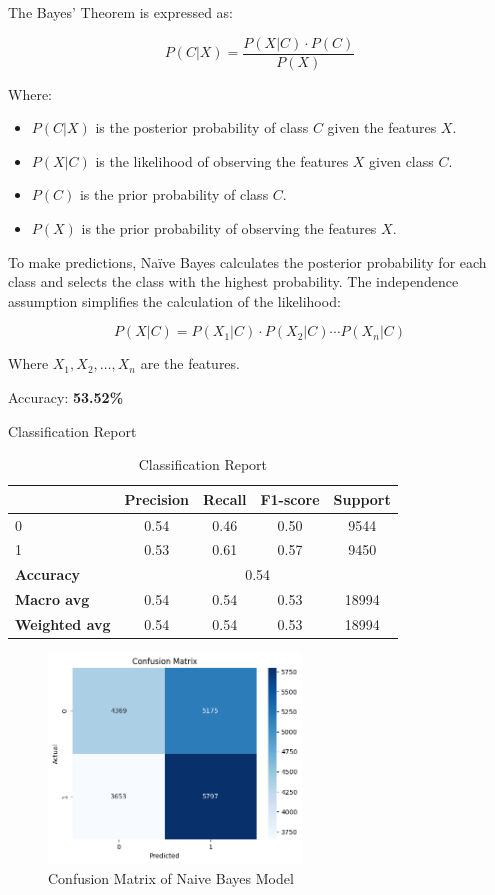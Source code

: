 The Bayes' Theorem is expressed as:

\[
P(C | X) = \frac{P(X | C) \cdot P(C)}{P(X)}
\]

Where:
\begin{itemize}
    \item \( P(C | X) \) is the posterior probability of class \( C \) given the features \( X \).
    \item \( P(X | C) \) is the likelihood of observing the features \( X \) given class \( C \).
    \item \( P(C) \) is the prior probability of class \( C \).
    \item \( P(X) \) is the prior probability of observing the features \( X \).
\end{itemize}

To make predictions, Naïve Bayes calculates the posterior probability for each class and selects the class with the highest probability. The independence assumption simplifies the calculation of the likelihood:

\[
P(X | C) = P(X_1 | C) \cdot P(X_2 | C) \cdots P(X_n | C)
\]

Where \( X_1, X_2, \ldots, X_n \) are the features.

Accuracy: \textbf{53.52\%}


Classification Report
\begin{table}[h]
    \centering
    \begin{tabular}{lcccc}
        \toprule
        & \textbf{Precision} & \textbf{Recall} & \textbf{F1-score} & \textbf{Support} \\
        \midrule
        0 & 0.54 & 0.46 & 0.50 & 9544 \\
        1 & 0.53 & 0.61 & 0.57 & 9450 \\
        \midrule
        \textbf{Accuracy} & \multicolumn{4}{c}{0.54} \\
        \textbf{Macro avg} & 0.54 & 0.54 & 0.53 & 18994 \\
        \textbf{Weighted avg} & 0.54 & 0.54 & 0.53 & 18994 \\
        \bottomrule
    \end{tabular}
    \caption{Classification Report}
    \label{tab:classification_report}
\end{table}

\begin{figure}[H] 
    \centering 
    \includegraphics[width=0.6\textwidth]{media/naive_bayes_confusion_matrix.png}
    \caption{Confusion Matrix of Naive Bayes Model}

\end{figure}


